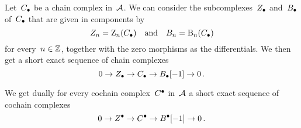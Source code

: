 \begin{remark}
  Let~$C_\bullet$ be a chain complex in~$\mathcal{A}$.
  We can consider the subcomplexes~$Z_\bullet$ and~$B_\bullet$ of~$C_\bullet$ that are given in components by
  \[
      Z_n
    = \operatorname{Z}_n(C_\bullet)
    \quad\text{and}\quad
      B_n
    = \operatorname{B}_n(C_\bullet)
  \]
  for every~$n \in \mathbb{Z}$, together with the zero morphisms as the differentials.
  We then get a short exact sequence of chain complexes
  \[
    0
    \to
    Z_\bullet
    \to
    C_\bullet
    \to
    B_\bullet[-1]
    \to
    0 \,.
  \]
  
  We get dually for every cochain complex~$C^\bullet$ in~$\mathcal{A}$ a short exact sequence of cochain complexes
  \[
    0
    \to
    Z^\bullet
    \to
    C^\bullet
    \to
    B^\bullet[-1]
    \to
    0 \,.
  \]

\end{remark}




